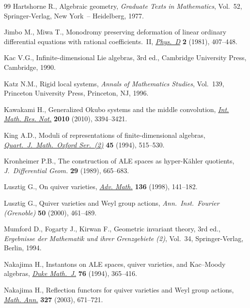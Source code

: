 \documentclass[pdftex]{sigma}
\numberwithin{equation}{section}
\theoremstyle{definition}
\begin{document}
\begin{thebibliography}{99}
Hartshorne R.,
Algebraic geometry,
{\it Graduate Texts in Mathematics}, Vol.~52, Springer-Verlag, New York~-- Heidelberg, 1977.

Jimbo M., Miwa T.,
Monodromy preserving deformation of linear ordinary
dif\/ferential equations with rational coef\/f\/icients.~II,
\href{http://dx.doi.org/10.1016/0167-2789(81)90021-X}{\emph{Phys.~D}} \textbf{2} (1981), 407--448.

Kac V.G.,
Inf\/inite-dimensional Lie algebras, 3rd ed.,
Cambridge University Press, Cambridge, 1990.

Katz N.M.,
Rigid local systems,
{\it Annals of Mathematics Studies}, Vol.~139, Princeton University Press, Princeton, NJ, 1996.

Kawakami H.,
Generalized Okubo systems and the middle convolution,
\href{http://dx.doi.org/10.1093/imrn/rnq012}{\emph{Int. Math. Res. Not.}} {\bf 2010} (2010), 3394--3421.

King A.D.,
Moduli of representations of f\/inite-dimensional algebras,
\href{http://dx.doi.org/10.1093/qmath/45.4.515}{\emph{Quart.\ J.\ Math.\ Oxford Ser.~(2)}} \textbf{45} (1994),  515--530.

Kronheimer P.B.,
The construction of ALE spaces as hyper-K\"ahler quotients,
\emph{J.\ Differential Geom.} \textbf{29} (1989), 665--683.

Lusztig G.,
On quiver varieties,
\href{http://dx.doi.org/10.1006/aima.1998.1729}{\emph{Adv. Math.}} \textbf{136} (1998), 141--182.

Lusztig G.,
Quiver varieties and Weyl group actions,
\emph{Ann.\ Inst.\ Fourier (Grenoble)} \textbf{50} (2000), 461--489.

Mumford D., Fogarty J., Kirwan F.,
Geometric invariant theory, 3rd ed.,
{\it Ergebnisse der Mathematik und ihrer Grenzgebiete (2)}, Vol.~34, Springer-Verlag, Berlin, 1994.

Nakajima H.,
Instantons on ALE spaces, quiver varieties, and Kac--Moody algebras,
\href{http://dx.doi.org/10.1215/S0012-7094-94-07613-8}{\emph{Duke Math.~J.}} \textbf{76} (1994), 365--416.

Nakajima H.,
Ref\/lection functors for quiver varieties and Weyl group actions,
\href{http://dx.doi.org/10.1007/s00208-003-0467-0}{\emph{Math. Ann.}} \textbf{327} (2003), 671--721.


\end{thebibliography}
\end{document}
